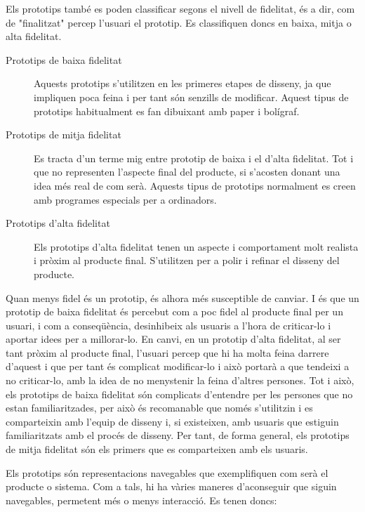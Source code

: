 Els prototips també es poden classificar segons el nivell de fidelitat, és a dir, com de "finalitzat" percep l'usuari el prototip. Es classifiquen doncs en baixa, mitja o alta fidelitat. 

\begin{description}
\item[Prototips de baixa fidelitat] Aquests prototips s'utilitzen en les primeres etapes de disseny, ja que impliquen poca feina i per tant són senzills de modificar. Aquest tipus de prototips habitualment es fan dibuixant amb paper i bolígraf. 
\item[Prototips de mitja fidelitat] Es tracta d'un terme mig entre prototip de baixa i el d'alta fidelitat. Tot i que no representen l'aspecte final del producte, si s'acosten donant una idea més real de com serà. Aquests tipus de prototips normalment es creen amb programes especials per a ordinadors.
\item[Prototips d'alta fidelitat] Els prototips d'alta fidelitat tenen un aspecte i comportament molt realista i pròxim al producte final. S'utilitzen per a polir i refinar el disseny del producte. 
\end{description}

Quan menys fidel és un prototip, és alhora més susceptible de canviar. I és que un prototip de baixa fidelitat és percebut com a poc fidel al producte final per un usuari, i com a conseqüència, desinhibeix als usuaris a l'hora de criticar-lo i aportar idees per a millorar-lo. En canvi, en un prototip d'alta fidelitat, al ser tant pròxim al producte final, l'usuari percep que hi ha molta feina darrere d'aquest i que per tant és complicat modificar-lo i això portarà a que tendeixi a no criticar-lo, amb la idea de no menystenir la feina d'altres persones. Tot i això, els prototips de baixa fidelitat són complicats d'entendre per les persones que no estan familiaritzades, per això és recomanable que només s'utilitzin i es comparteixin amb l'equip de disseny i, si existeixen, amb usuaris que estiguin familiaritzats amb el procés de disseny. Per tant, de forma general, els prototips de mitja fidelitat són els primers que es comparteixen amb els usuaris. 


Els prototips són representacions navegables que exemplifiquen com serà el producte o sistema. Com a tals, hi ha vàries maneres d'aconseguir que siguin navegables, permetent més o menys interacció. Es tenen doncs:

